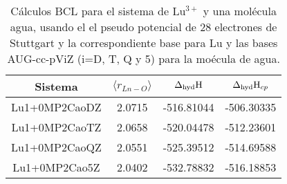  \begin{center}                                                                            
 \begin{table}[h!]
 \centering
 \caption{\footnotesize C\'alculos BCL para el sistema de Lu$^{3+}$ y 
una mol\'ecula agua, usando el el pseudo potencial de 28 electrones 
de Stuttgart y la correspondiente base para Lu y las bases AUG-cc-pViZ
(i=D, T, Q y 5) para la mo\'ecula de agua.}                                                                  
 \begin{tabular}{c|ccc}\hline\hline                                                          
 Sistema & $\langle r_{Ln-O}\rangle$ & $\Delta_{\textnormal{hyd}}\textnormal{H}$ 
 & $\Delta_{\textnormal{hyd}}\textnormal{H}_{cp}$ \\ \hline                                               
Lu1+0MP2CaoDZ & 2.0715 & -516.81044 & -506.30335 \\
Lu1+0MP2CaoTZ & 2.0658 & -520.04478 & -512.23601 \\
Lu1+0MP2CaoQZ & 2.0551 & -525.39512 & -514.69588 \\
Lu1+0MP2Cao5Z & 2.0402 & -532.78832 & -516.18853 \\
 \hline \end{tabular}\label{tLuCao}    
 \end{table}                                                           
 \end{center}                                                                              
